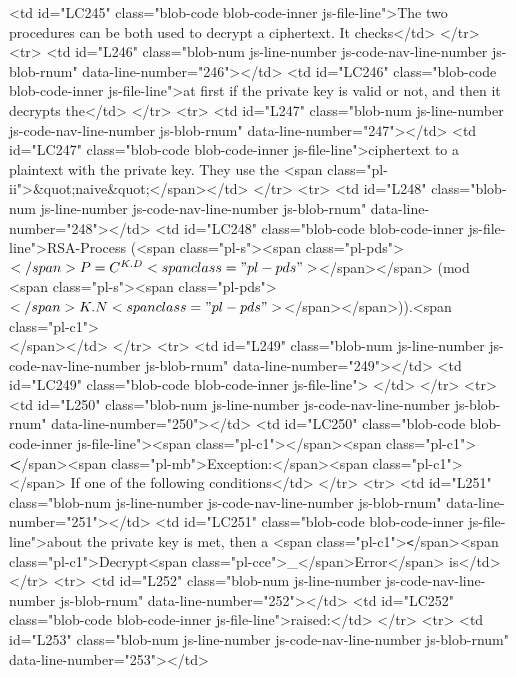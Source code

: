           <td id="LC245" class="blob-code blob-code-inner js-file-line">The two procedures can be both used to decrypt a ciphertext. It checks</td>
        </tr>
        <tr>
          <td id="L246" class="blob-num js-line-number js-code-nav-line-number js-blob-rnum" data-line-number="246"></td>
          <td id="LC246" class="blob-code blob-code-inner js-file-line">at first if the private key is valid or not, and then it decrypts the</td>
        </tr>
        <tr>
          <td id="L247" class="blob-num js-line-number js-code-nav-line-number js-blob-rnum" data-line-number="247"></td>
          <td id="LC247" class="blob-code blob-code-inner js-file-line">ciphertext to a plaintext with the private key. They use the <span class="pl-ii">&quot;naive&quot;</span></td>
        </tr>
        <tr>
          <td id="L248" class="blob-num js-line-number js-code-nav-line-number js-blob-rnum" data-line-number="248"></td>
          <td id="LC248" class="blob-code blob-code-inner js-file-line">RSA-Process (<span class="pl-s"><span class="pl-pds">$</span>P=C^{K.D}<span class="pl-pds">$</span></span> (mod <span class="pl-s"><span class="pl-pds">$</span>K.N<span class="pl-pds">$</span></span>)).<span class="pl-c1">\\</span></td>
        </tr>
        <tr>
          <td id="L249" class="blob-num js-line-number js-code-nav-line-number js-blob-rnum" data-line-number="249"></td>
          <td id="LC249" class="blob-code blob-code-inner js-file-line">
</td>
        </tr>
        <tr>
          <td id="L250" class="blob-num js-line-number js-code-nav-line-number js-blob-rnum" data-line-number="250"></td>
          <td id="LC250" class="blob-code blob-code-inner js-file-line"><span class="pl-c1">\noindent</span><span class="pl-c1">\textbf</span>{<span class="pl-mb">Exception:</span>}<span class="pl-c1">\\</span> If one of the following conditions</td>
        </tr>
        <tr>
          <td id="L251" class="blob-num js-line-number js-code-nav-line-number js-blob-rnum" data-line-number="251"></td>
          <td id="LC251" class="blob-code blob-code-inner js-file-line">about the private key is met, then a <span class="pl-c1">\texttt</span>{<span class="pl-c1">Decrypt<span class="pl-cce">\_</span>Error</span>} is</td>
        </tr>
        <tr>
          <td id="L252" class="blob-num js-line-number js-code-nav-line-number js-blob-rnum" data-line-number="252"></td>
          <td id="LC252" class="blob-code blob-code-inner js-file-line">raised:</td>
        </tr>
        <tr>
          <td id="L253" class="blob-num js-line-number js-code-nav-line-number js-blob-rnum" data-line-number="253"></td>

